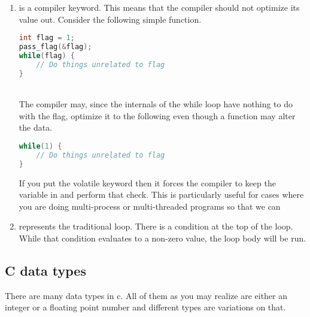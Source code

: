 \begin{enumerate}
	    \item {} is a compiler keyword.
        This means that the compiler should not optimize its value out.
        Consider the following simple function.
	      \\
	      \begin{lstlisting}[language=C]
int flag = 1;
pass_flag(&flag);
while(flag) {
    // Do things unrelated to flag
}
\end{lstlisting}
	      \\
	      The compiler may, since the internals of the while loop have nothing to do with the flag, optimize it to the following even though a function may alter the data.
	      \\
	      \begin{lstlisting}[language=C]
while(1) {
    // Do things unrelated to flag
}
\end{lstlisting}
	      If you put the volatile keyword then it forces the compiler to keep the variable in and perform that check. This is particularly useful for cases where you are doing multi-process or multi-threaded programs so that we can
	\item {} represents the traditional  loop. There is a condition at the top of the loop. While that condition evaluates to a non-zero value, the loop body will be run.
\end{enumerate}

\subsection{C data types}

There are many data types in c. All of them as you may realize are either an integer or a floating point number and different types are variations on that.

